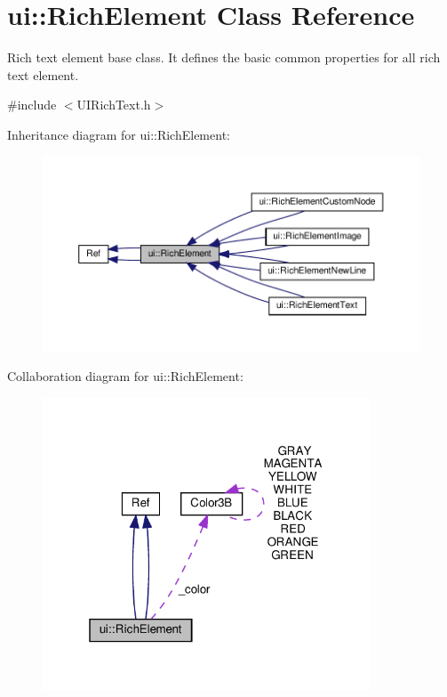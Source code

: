 \hypertarget{classui_1_1RichElement}{}\section{ui\+:\+:Rich\+Element Class Reference}
\label{classui_1_1RichElement}


Rich text element base class. It defines the basic common properties for all rich text element.  




{\ttfamily \#include $<$U\+I\+Rich\+Text.\+h$>$}



Inheritance diagram for ui\+:\+:Rich\+Element\+:
\nopagebreak
\begin{figure}[H]
\begin{center}
\leavevmode
\includegraphics[width=350pt]{classui_1_1RichElement__inherit__graph}
\end{center}
\end{figure}


Collaboration diagram for ui\+:\+:Rich\+Element\+:
\nopagebreak
\begin{figure}[H]
\begin{center}
\leavevmode
\includegraphics[width=277pt]{classui_1_1RichElement__coll__graph}
\end{center}
\end{figure}
